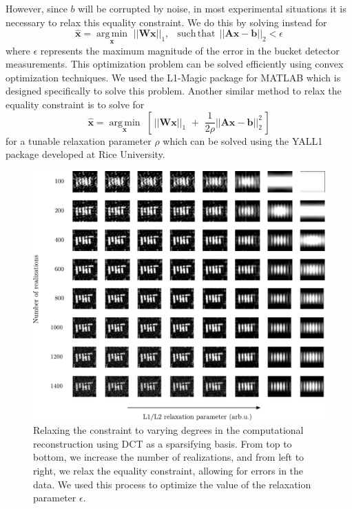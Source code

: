 However, since $b$ will be corrupted by noise, in most experimental situations it is necessary to relax this equality constraint. We do this by solving instead for
\begin{equation}
\hat{\mathbf{x}} = \underset{\mathbf{x}}{\operatorname{arg\,min}}\,\,||\mathbf{W}\mathbf{x}||_1,\,\,\, \operatorname{such\,that}\,||\mathbf{A}\mathbf{x} - \mathbf{b}||_2<\epsilon
\end{equation}
where $\epsilon$ represents the maximum magnitude of the error in the bucket detector measurements. This optimization problem can be solved efficiently using convex optimization techniques. We used the L1-Magic \cite{l1magic} package for MATLAB which is designed specifically to solve this problem. Another similar method to relax the equality constraint is to solve for
\begin{equation}
\hat{\mathbf{x}} = \underset{\mathbf{x}}{\operatorname{arg\,min}}\,\,\left[\,||\mathbf{W}\mathbf{x}||_1\,\,+\,\,\frac{1}{2\rho}||\mathbf{A}\mathbf{x} - \mathbf{b}||_2^2\,\right]
\end{equation}
for a tunable relaxation parameter $\rho$ which can be solved using the YALL1 package \cite{yall1} developed at Rice University.


\begin{figure}[h!]
\begin{center}
\includegraphics[width=\textwidth]{figure-ghost-compressed-tuning.pdf}
\caption{Relaxing the constraint to varying degrees in the computational reconstruction using DCT as a sparsifying basis. From top to bottom, we increase the number of realizations, and from left to right, we relax the equality constraint, allowing for errors in the data. We used this process to optimize the value of the relaxation parameter $\epsilon$.}
\label{figure:ghost-compressed-tuning}
\end{center}
\end{figure}

